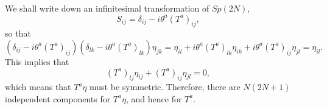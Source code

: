 \begin{solution}
    We shall write down an infinitesimal transformation of $Sp(2N)$,
    \begin{equation}
        S_{ij} = \delta_{ij} -i\theta^a(T^a)_{ij},
    \end{equation}
    so that
    \begin{equation}
        (\delta_{ij} -i\theta^a(T^a)_{ij})(\delta_{lk} -i\theta^a(T^a)_{lk})\eta_{jk} = \eta_{il} + i\theta^a(T^a)_{lk}\eta_{ik} + i\theta^a(T^a)_{ij}\eta_{jl} = \eta_{il}.
    \end{equation}
    This implies that
    \begin{equation}
        (T^a)_{lj}\eta_{ij} + (T^a)_{ij}\eta_{jl} = 0,
    \end{equation}
    which means that $T^a\eta$ must be symmetric. Therefore, there are $N(2N+1)$ independent components for $T^a\eta$, and hence for $T^a$.
\end{solution}